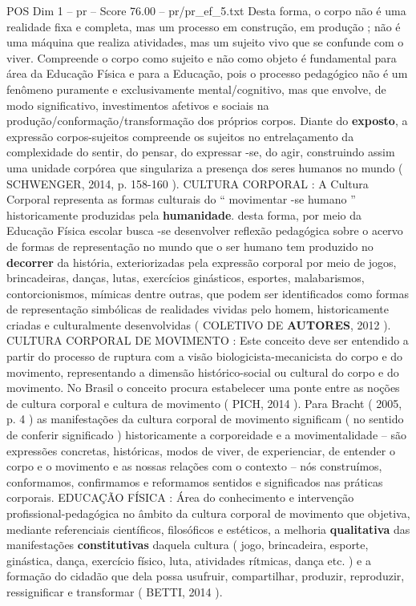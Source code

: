 \begin{textsample}{POS Dim 1 – pr – Score 76.00 – pr/pr\_ef\_5.txt}
Desta forma, o corpo não é uma realidade fixa e completa, mas um processo em construção, em produção ; não é uma máquina que realiza atividades, mas um sujeito vivo que se confunde com o viver.
Compreende o corpo como sujeito e não como objeto é fundamental para área da Educação Física e para a Educação, pois o processo pedagógico não é um fenômeno puramente e exclusivamente mental/cognitivo, mas que envolve, de modo significativo, investimentos afetivos e sociais na produção/conformação/transformação dos próprios corpos.
Diante do \textbf{exposto}, a expressão corpos-sujeitos compreende os sujeitos no entrelaçamento da complexidade do sentir, do pensar, do expressar -se, do agir, construindo assim uma unidade corpórea que singulariza a presença dos seres humanos no mundo ( SCHWENGER, 2014, p. 158-160 ).
CULTURA CORPORAL : A Cultura Corporal representa as formas culturais do “ movimentar -se humano ” historicamente produzidas pela \textbf{humanidade}. desta forma, por meio da Educação Física escolar busca -se desenvolver reflexão pedagógica sobre o acervo de formas de representação no mundo que o ser humano tem produzido no \textbf{decorrer} da história, exteriorizadas pela expressão corporal por meio de jogos, brincadeiras, danças, lutas, exercícios ginásticos, esportes, malabarismos, contorcionismos, mímicas dentre outras, que podem ser identificados como formas de representação simbólicas de realidades vividas pelo homem, historicamente criadas e culturalmente desenvolvidas ( COLETIVO DE \textbf{AUTORES}, 2012 ).
CULTURA CORPORAL DE MOVIMENTO : Este conceito deve ser entendido a partir do processo de ruptura com a visão biologicista-mecanicista do corpo e do movimento, representando a dimensão histórico-social ou cultural do corpo e do movimento.
No Brasil o conceito procura estabelecer uma ponte entre as noções de cultura corporal e cultura de movimento ( PICH, 2014 ).
Para Bracht ( 2005, p. 4 ) as manifestações da cultura corporal de movimento significam ( no sentido de conferir significado ) historicamente a corporeidade e a movimentalidade – são expressões concretas, históricas, modos de viver, de experienciar, de entender o corpo e o movimento e as nossas relações com o contexto – nós construímos, conformamos, confirmamos e reformamos sentidos e significados nas práticas corporais.
EDUCAÇÃO FÍSICA : Área do conhecimento e intervenção profissional-pedagógica no âmbito da cultura corporal de movimento que objetiva, mediante referenciais científicos, filosóficos e estéticos, a melhoria \textbf{qualitativa} das manifestações \textbf{constitutivas} daquela cultura ( jogo, brincadeira, esporte, ginástica, dança, exercício físico, luta, atividades rítmicas, dança etc. ) e a formação do cidadão que dela possa usufruir, compartilhar, produzir, reproduzir, ressignificar e transformar ( BETTI, 2014 ).

\end{textsample}
